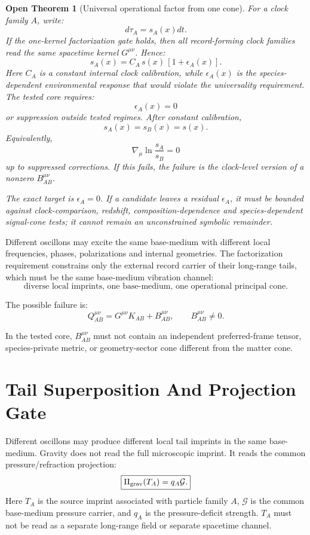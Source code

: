 \documentclass[11pt]{article}
\newtheorem{openthm}{Open Theorem}
\begin{document}
\begin{openthm}[Universal operational factor from one cone]
For a clock family \(A\), write:
\[
d\tau_A=s_A(x)dt.
\]
If the one-kernel factorization gate holds, then all record-forming clock
families read the same spacetime kernel \(G^{\mu\nu}\).  Hence:
\[
\boxed{
s_A(x)=C_A\,s(x)\,[1+\epsilon_A(x)].
}
\]
Here \(C_A\) is a constant internal clock calibration, while
\(\epsilon_A(x)\) is the species-dependent environmental response that would
violate the universality requirement.
The tested core requires:
\[
\boxed{
\epsilon_A(x)=0
}
\]
or suppression outside tested regimes.  After constant calibration,
\[
\boxed{
s_A(x)=s_B(x)=s(x).
}
\]
Equivalently,
\[
\boxed{
\nabla_\mu\ln\frac{s_A}{s_B}=0
}
\]
up to suppressed corrections.  If this fails, the failure is the clock-level
version of a nonzero \(B_{AB}^{\mu\nu}\).

The exact target is \(\epsilon_A=0\).  If a candidate leaves a residual
\(\epsilon_A\), it must be bounded against clock-comparison, redshift,
composition-dependence and species-dependent signal-cone tests; it cannot
remain an unconstrained symbolic remainder.
\end{openthm}

Different oscillons may excite the same base-medium with different local
frequencies, phases, polarizations and internal geometries.  The factorization
requirement constrains only the external record carrier of their long-range
tails, which must be the same base-medium vibration channel:
\[
\boxed{
\text{diverse local imprints, one base-medium, one operational principal cone}.
}
\]

The possible failure is:
\[
\boxed{
Q_{AB}^{\mu\nu}
=
G^{\mu\nu}K_{AB}
+
B_{AB}^{\mu\nu},
\qquad
B_{AB}^{\mu\nu}\neq0.
}
\]

In the tested core, $B_{AB}^{\mu\nu}$ must not contain an independent
preferred-frame tensor, species-private metric, or geometry-sector cone
different from the matter cone.

\section{Tail Superposition And Projection Gate}

Different oscillons may produce different local tail imprints in the same
base-medium.  Gravity does not read the full microscopic imprint.  It reads the
common pressure/refraction projection:
\[
\boxed{
\Pi_{\rm grav}(T_A)=q_A\mathcal G.
}
\]
Here $T_A$ is the source imprint associated with particle family $A$,
\(\mathcal G\) is the common base-medium pressure carrier, and \(q_A\) is the
pressure-deficit strength.  \(T_A\) must not be read as a separate long-range
field or separate spacetime channel.
\end{document}
